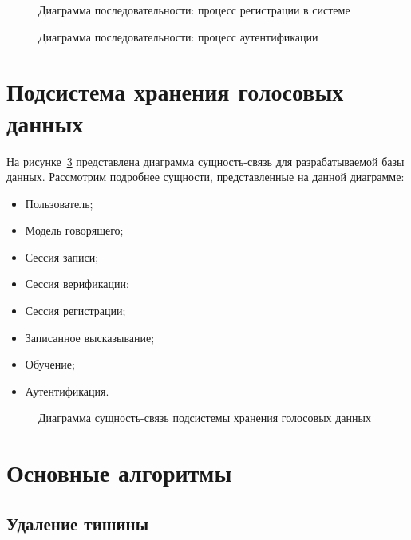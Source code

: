 \begin{figure}
    \center{
    
    }
    \caption{Диаграмма последовательности: процесс регистрации в системе}
    \label{fig:seq_enrollment}
\end{figure}


\begin{figure}
    \center{
    
    }
    \caption{Диаграмма последовательности: процесс аутентификации}
    \label{fig:seq_verification}
\end{figure}

\section{Подсистема хранения голосовых данных}

На рисунке~\ref{fig:er_main} представлена диаграмма сущность-связь для разрабатываемой базы данных. Рассмотрим подробнее сущности, представленные на данной диаграмме:

\begin{itemize}
\item Пользователь;
\item Модель говорящего;
\item Сессия записи;
\item Сессия верификации;
\item Сессия регистрации;
\item Записанное высказывание;
\item Обучение;
\item Аутентификация.
\end{itemize}

\begin{figure}
    
    \caption{Диаграмма сущность-связь подсистемы хранения голосовых данных}
    \label{fig:er_main}
\end{figure}


\section{Основные алгоритмы}

\subsection{Удаление тишины}

